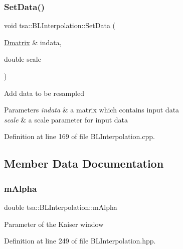 \subsubsection{\texorpdfstring{Set\+Data()}{SetData()}}
{\footnotesize\ttfamily void tsa\+::\+B\+L\+Interpolation\+::\+Set\+Data (\begin{DoxyParamCaption}\item[{\hyperlink{namespacetsa_ad260cd21c1891c4ed391fe788569aba4}{Dmatrix} \&}]{indata,  }\item[{double}]{scale }\end{DoxyParamCaption})}

Add data to be resampled


\begin{DoxyParams}{Parameters}
{\em indata} & a matrix which contains input data \\
\hline
{\em scale} & a scale parameter for input data \\
\hline
\end{DoxyParams}


Definition at line 169 of file B\+L\+Interpolation.\+cpp.



\subsection{Member Data Documentation}
\mbox{\label{classtsa_1_1_b_l_interpolation_a768c64c85e393f975e2caaaba7bc5f90}} 
\subsubsection{\texorpdfstring{m\+Alpha}{mAlpha}}
{\footnotesize\ttfamily double tsa\+::\+B\+L\+Interpolation\+::m\+Alpha\hspace{0.3cm}{\ttfamily [private]}}

Parameter of the Kaiser window 

Definition at line 249 of file B\+L\+Interpolation.\+hpp.

\mbox{\label{classtsa_1_1_b_l_interpolation_ad40701a7e17ce4a2368605c0e77ec6a7}} 

